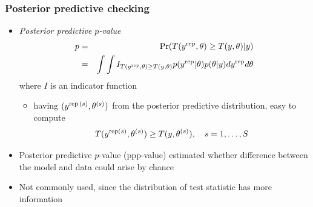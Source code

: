 \documentclass[10pt,handout]{beamer}
\begin{document}
\begin{frame}[fragile]

\frametitle{Posterior predictive checking}

  \begin{itemize}
  \item<1-> \textit{Posterior predictive $p$-value}
    \begin{eqnarray*}
      p & = & \Pr(T(y^{\operatorname{\mathrm{rep}}},\theta)\geq T(y,\theta)|y)\\
      & = & \int\int
      I_{T(y^{\operatorname{\mathrm{rep}}},\theta)\geq T(y,\theta)}p(y^{\operatorname{\mathrm{rep}}}|\theta)p(\theta|y)dy^{\operatorname{\mathrm{rep}}}d\theta
    \end{eqnarray*}
    where $I$ is an indicator function
    \begin{itemize}
    \item<2->  having $(y^{\operatorname{\mathrm{rep}}\,(s)},\theta^{(s)})$ from the posterior predictive
      distribution, easy to compute
      \begin{equation*}
        T(y^{\operatorname{\mathrm{rep}} (s)},\theta^{(s)})\geq T(y,\theta^{(s)}), \quad s=1,\ldots,S
      \end{equation*}
    \end{itemize}
    \vspace{-1.5\baselineskip}
  \item<3-> Posterior predictive $p$-value (ppp-value) estimated whether
    difference between the model and data could arise by chance
  \item<4-> \color{black} Not commonly used, since the distribution of test
    statistic has more information
  \end{itemize}

\end{frame}




\end{document}
